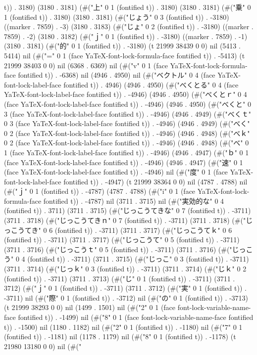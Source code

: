 t)) . 3180) (3180 . 3181) (#("上" 0 1 (fontified t)) . 3180) (3180 . 3181) (#("乗" 0 1 (fontified t)) . 3180) (3180 . 3181) (#("じょう" 0 3 (fontified t)) . -3180) ((marker . 7859) . -3) (3180 . 3183) (#("じょ" 0 2 (fontified t)) . -3180) ((marker . 7859) . -2) (3180 . 3182) (#("ｊ" 0 1 (fontified t)) . -3180) ((marker . 7859) . -1) (3180 . 3181) (#("的" 0 1 (fontified t)) . -3180) (t 21999 38439 0 0) nil (5413 . 5414) nil (#("=" 0 1 (face YaTeX-font-lock-formula-face fontified t)) . -5413) (t 21999 38403 0 0) nil (6368 . 6369) nil (#("v" 0 1 (face YaTeX-font-lock-formula-face fontified t)) . -6368) nil (4946 . 4950) nil (#("ベクトル" 0 4 (face YaTeX-font-lock-label-face fontified t)) . 4946) (4946 . 4950) (#("べくとる" 0 4 (face YaTeX-font-lock-label-face fontified t)) . -4946) (4946 . 4950) (#("べくとｒ" 0 4 (face YaTeX-font-lock-label-face fontified t)) . -4946) (4946 . 4950) (#("べくと" 0 3 (face YaTeX-font-lock-label-face fontified t)) . -4946) (4946 . 4949) (#("べくｔ" 0 3 (face YaTeX-font-lock-label-face fontified t)) . -4946) (4946 . 4949) (#("べく" 0 2 (face YaTeX-font-lock-label-face fontified t)) . -4946) (4946 . 4948) (#("べｋ" 0 2 (face YaTeX-font-lock-label-face fontified t)) . -4946) (4946 . 4948) (#("べ" 0 1 (face YaTeX-font-lock-label-face fontified t)) . -4946) (4946 . 4947) (#("ｂ" 0 1 (face YaTeX-font-lock-label-face fontified t)) . -4946) (4946 . 4947) (#("速" 0 1 (face YaTeX-font-lock-label-face fontified t)) . -4946) nil (#("度" 0 1 (face YaTeX-font-lock-label-face fontified t)) . -4947) (t 21999 38364 0 0) nil (4787 . 4788) nil (#("ｊ" 0 1 (fontified t)) . -4787) (4787 . 4788) (#("i" 0 1 (face YaTeX-font-lock-formula-face fontified t)) . -4787) nil (3711 . 3715) nil (#("実効的な" 0 4 (fontified t)) . 3711) (3711 . 3715) (#("じっこうてきな" 0 7 (fontified t)) . -3711) (3711 . 3718) (#("じっこうてきｎ" 0 7 (fontified t)) . -3711) (3711 . 3718) (#("じっこうてき" 0 6 (fontified t)) . -3711) (3711 . 3717) (#("じっこうてｋ" 0 6 (fontified t)) . -3711) (3711 . 3717) (#("じっこうて" 0 5 (fontified t)) . -3711) (3711 . 3716) (#("じっこうｔ" 0 5 (fontified t)) . -3711) (3711 . 3716) (#("じっこう" 0 4 (fontified t)) . -3711) (3711 . 3715) (#("じっこ" 0 3 (fontified t)) . -3711) (3711 . 3714) (#("じっｋ" 0 3 (fontified t)) . -3711) (3711 . 3714) (#("じｋ" 0 2 (fontified t)) . -3711) (3711 . 3713) (#("じ" 0 1 (fontified t)) . -3711) (3711 . 3712) (#("ｊ" 0 1 (fontified t)) . -3711) (3711 . 3712) (#("実" 0 1 (fontified t)) . -3711) nil (#("際" 0 1 (fontified t)) . -3712) nil (#("の" 0 1 (fontified t)) . -3713) (t 21999 38293 0 0) nil (1499 . 1501) nil (#("2" 0 1 (face font-lock-variable-name-face fontified t)) . -1499) nil (#("8" 0 1 (face font-lock-variable-name-face fontified t)) . -1500) nil (1180 . 1182) nil (#("2" 0 1 (fontified t)) . -1180) nil (#("7" 0 1 (fontified t)) . -1181) nil (1178 . 1179) nil (#("8" 0 1 (fontified t)) . -1178) (t 21980 13180 0 0) nil (#("
